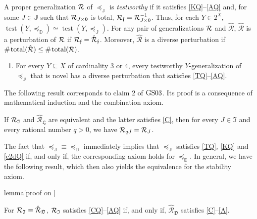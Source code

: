 \documentclass[12pt,a4paper,twoside]{article}
\newcommand{\gsii}{$\textup{GS03}$}
\newcommand{\novel}{\mathfrak f}
\newcommand{\test}{\operatorname{test}}
\newcommand{\preceqb}{\mathbin{\preceq}}
\newcommand{\countof}{\mathbin{\#}\hskip1pt}
\newcommand{\ext}{\mathrel{\mc R}}
\newcommand{\extb}{\mathbin{\mc R}}
\newcommand{\hext}{\mathrel{\hat{\mathrel{\mathcal R}}}}
\newcommand{\hextb}{\mathbin{\hat{\mathbin{\mathcal R}}}}
\newcommand{\total}{\textup{total}}
\newcommand{\mbbd}{{\mathds D}}
\newcommand{\dpp}{{\mathfrak D}}
\newcommand{\mbbipp}{{\mathfrak L}}
\newcommand{\mbbj}{\mathds J}
\newcommand{\mbbjpp}{\mathfrak{I}}
\begin{document}
\begin{appendices}
\begin{enumerate}[label=\textup{A\arabic*}$^{'\flat}$,resume]

\end{enumerate}


A proper {generalization} $\ext$ of $\preceqb _{\mbbj}$ is \emph{testworthy} if
it satisfies \ref{KQ}--\ref{AQ} and, for some $J\in \mbbj$ such that
$\ext_{J\times 0}$ is total, $\extb_{\novel} = \extb_{J\times 0}^{-1}$. Thus,
for each $Y \in 2^{X}$,
$\test ( Y , \preceqb _{\mbbd} ) \simeq \test ( Y , \preceqb _{\mbbj
})$. For any pair of {generalization}s $\ext$ and $\hext$, $\hext$ is a perturbation
of $\ext$ if $\extb_{\novel} = \hextb_{\novel}$. Moreover, $\hext$ is a
{{diverse}} perturbation if
$\countof \total (\hext) \leq \countof \total (\ext)$.
\begin{enumerate}[label=\textit{4}-\textup{P}$^{\flat}$]
\item\label{PQ} For every $Y \subseteq X$ of cardinality $3$ or $4$, every
  testworthy $Y$-{generalization} of $\preceqb _{\mbbj}$ that is novel has a
  {{diverse}} perturbation that satisfies \ref{TQ}–\ref{AQ}.
\end{enumerate}


The following result corresponds to claim 2 of \gsii. Its proof is a consequence
of mathematical induction and the combination axiom.
\begin{lemma}\label{lem-coneQ}

  If $\ext _ \mbbjpp$ and $\hext _ \mbbipp$ are equivalent and the latter
satisfies \ref{C}, then for every $J \in \mbbjpp$ and every rational number
$q >0$, we have $\extb _{q J}  =  \extb _{J}$.

\end{lemma}
The fact that $\preceqb_{\mbbj}\equiv \preceqb_{\mbbd}$ immediately implies
that $\preceqb_{\mbbj}$ satisfies \ref{TQ}, \ref{KQ} and \ref{c2dQ} if, and
only if, the corresponding axiom holds for $\preceq_{\mbbd}$. In general, we
have the following result, which then also yields the equivalence for the
{stability} axiom.

\begin{theoremEnd}{lemma}[proof on ]
  \label{lem-axiomsQ}

  For $\extb _{\mbbjpp} \equiv \hextb _{\dpp}$, $\ext _ {\mbbjpp}$ satisfies
  \ref{CQ}--\ref{AQ} if, and only if, $\hext_{\dpp}$ satisfies
  \ref{C}--\ref{A}.
\end{theoremEnd}


\end{appendices}
\end{document}
